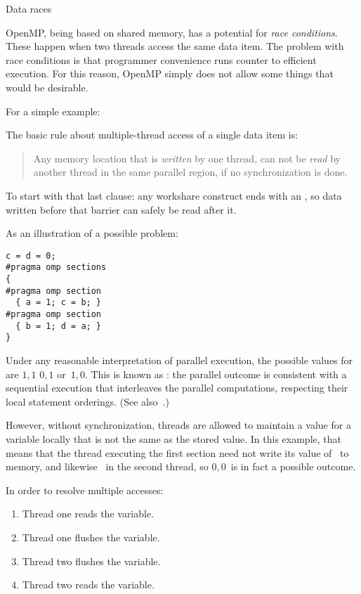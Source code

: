  {Data races}

OpenMP, being based on shared memory, has a potential for \emph{race
  conditions}. These happen when two threads access the same data
item. The problem with race conditions is that programmer convenience
runs counter to efficient execution. For this reason, OpenMP simply
does not allow some things that would be desirable.

For a simple example:

The basic rule about multiple-thread access of a single data item is:
\begin{quote}
  Any memory location that is \emph{written} by one thread, can not be
  \emph{read} by another thread in the same parallel region, if no
  synchronization is done.
\end{quote}

To start with that last clause: any workshare construct ends with an
, so data written before that barrier
can safely be read after it.

As an illustration of a possible problem:
\begin{lstlisting}
c = d = 0;
#pragma omp sections
{
#pragma omp section
  { a = 1; c = b; }
#pragma omp section
  { b = 1; d = a; }
}
\end{lstlisting}
Under any reasonable interpretation of parallel execution,
the possible values for  are $1,1$ $0,1$ or~$1,0$.
This is known as :
the parallel outcome is consistent with a sequential execution that
interleaves the parallel computations, respecting their local statement orderings.
(See also~.)

However, without synchronization, threads are allowed to maintain a value for a
variable locally that is not the same as the stored value. In this
example, that means that the thread executing the first section need
not write its value of~ to memory, and likewise ~in the
second thread, so $0,0$~is in fact a possible outcome.

In order to resolve multiple accesses:
\begin{enumerate}
\item Thread one reads the variable.
\item Thread one flushes the variable.
\item Thread two flushes the variable.
\item Thread two reads the variable.
\end{enumerate}

